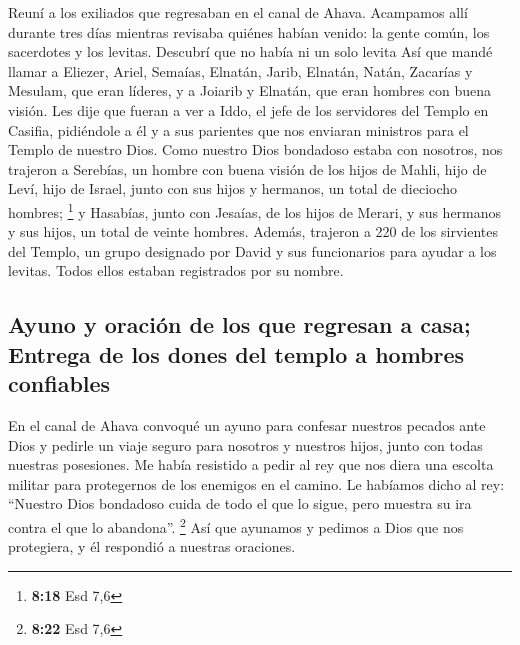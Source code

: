  Reuní a los exiliados que regresaban en el canal de
Ahava. Acampamos allí durante tres días mientras revisaba quiénes habían
venido: la gente común, los sacerdotes y los levitas. Descubrí que no
había ni un solo levita  Así que mandé llamar a Eliezer,
Ariel, Semaías, Elnatán, Jarib, Elnatán, Natán, Zacarías y Mesulam, que
eran líderes, y a Joiarib y Elnatán, que eran hombres con buena visión.
 Les dije que fueran a ver a Iddo, el jefe de los
servidores del Templo en Casifia, pidiéndole a él y a sus parientes que
nos enviaran ministros para el Templo de nuestro Dios. 
Como nuestro Dios bondadoso estaba con nosotros, nos trajeron a
Serebías, un hombre con buena visión de los hijos de Mahli, hijo de
Leví, hijo de Israel, junto con sus hijos y hermanos, un total de
dieciocho hombres; \footnote{\textbf{8:18} Esd 7,6}  y
Hasabías, junto con Jesaías, de los hijos de Merari, y sus hermanos y
sus hijos, un total de veinte hombres.  Además, trajeron
a 220 de los sirvientes del Templo, un grupo designado por David y sus
funcionarios para ayudar a los levitas. Todos ellos estaban registrados
por su nombre.

\hypertarget{ayuno-y-oraciuxf3n-de-los-que-regresan-a-casa-entrega-de-los-dones-del-templo-a-hombres-confiables}{%
\subsection{Ayuno y oración de los que regresan a casa; Entrega de los
dones del templo a hombres
confiables}\label{ayuno-y-oraciuxf3n-de-los-que-regresan-a-casa-entrega-de-los-dones-del-templo-a-hombres-confiables}}

 En el canal de Ahava convoqué un ayuno para confesar
nuestros pecados ante Dios y pedirle un viaje seguro para nosotros y
nuestros hijos, junto con todas nuestras posesiones.  Me
había resistido a pedir al rey que nos diera una escolta militar para
protegernos de los enemigos en el camino. Le habíamos dicho al rey:
``Nuestro Dios bondadoso cuida de todo el que lo sigue, pero muestra su
ira contra el que lo abandona''. \footnote{\textbf{8:22} Esd 7,6}
 Así que ayunamos y pedimos a Dios que nos protegiera, y
él respondió a nuestras oraciones.

